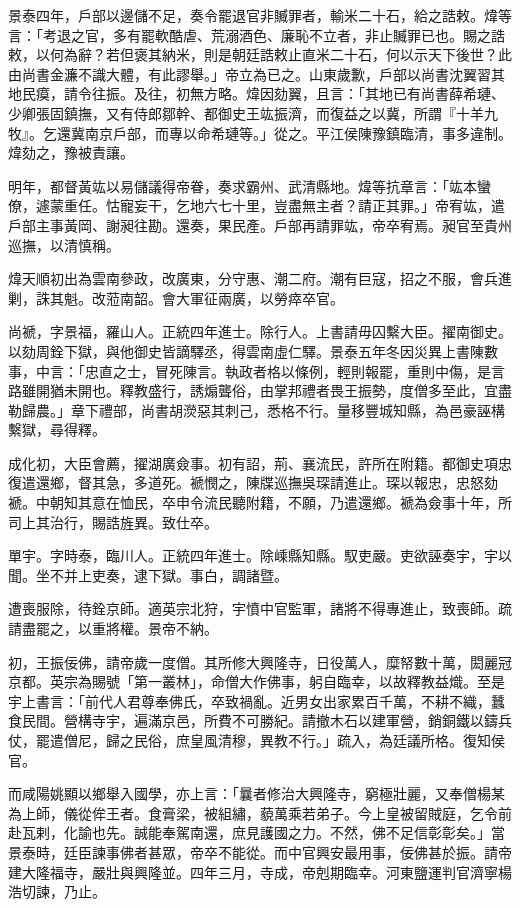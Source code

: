 \begin{pinyinscope}
景泰四年，戶部以邊儲不足，奏令罷退官非贓罪者，輸米二十石，給之誥敕。煒等言：「考退之官，多有罷軟酷虐、荒溺酒色、廉恥不立者，非止贓罪已也。賜之誥敕，以何為辭？若但褒其納米，則是朝廷誥敕止直米二十石，何以示天下後世？此由尚書金濂不識大體，有此謬舉。」帝立為已之。山東歲歉，戶部以尚書沈翼習其地民瘼，請令往振。及往，初無方略。煒因劾翼，且言：「其地已有尚書薛希璉、少卿張固鎮撫，又有侍郎鄒幹、都御史王竑振濟，而復益之以冀，所謂『十羊九牧』。乞還冀南京戶部，而專以命希璉等。」從之。平江侯陳豫鎮臨清，事多違制。煒劾之，豫被責讓。

明年，都督黃竑以易儲議得帝眷，奏求霸州、武清縣地。煒等抗章言：「竑本蠻僚，遽蒙重任。怙寵妄干，乞地六七十里，豈盡無主者？請正其罪。」帝宥竑，遣戶部主事黃岡、謝昶往勘。還奏，果民產。戶部再請罪竑，帝卒宥焉。昶官至貴州巡撫，以清慎稱。

煒天順初出為雲南參政，改廣東，分守惠、潮二府。潮有巨寇，招之不服，會兵進剿，誅其魁。改蒞南韶。會大軍征兩廣，以勞瘁卒官。

尚褫，字景福，羅山人。正統四年進士。除行人。上書請毋囚繫大臣。擢南御史。以劾周銓下獄，與他御史皆謫驛丞，得雲南虛仁驛。景泰五年冬因災異上書陳數事，中言：「忠直之士，冒死陳言。執政者格以條例，輕則報罷，重則中傷，是言路雖開猶未開也。釋教盛行，誘煽聾俗，由掌邦禮者畏王振勢，度僧多至此，宜盡勒歸農。」章下禮部，尚書胡濙惡其刺己，悉格不行。量移豐城知縣，為邑豪誣構繫獄，尋得釋。

成化初，大臣會薦，擢湖廣僉事。初有詔，荊、襄流民，許所在附籍。都御史項忠復遣還鄉，督其急，多道死。褫憫之，陳牒巡撫吳琛請進止。琛以報忠，忠怒劾褫。中朝知其意在恤民，卒申令流民聽附籍，不願，乃遣還鄉。褫為僉事十年，所司上其治行，賜誥旌異。致仕卒。

單宇。字時泰，臨川人。正統四年進士。除嵊縣知縣。馭吏嚴。吏欲誣奏宇，宇以聞。坐不并上吏奏，逮下獄。事白，調諸暨。

遭喪服除，待銓京師。適英宗北狩，宇憤中官監軍，諸將不得專進止，致喪師。疏請盡罷之，以重將權。景帝不納。

初，王振佞佛，請帝歲一度僧。其所修大興隆寺，日役萬人，糜帑數十萬，閎麗冠京都。英宗為賜號「第一叢林」，命僧大作佛事，躬自臨幸，以故釋教益熾。至是宇上書言：「前代人君尊奉佛氏，卒致禍亂。近男女出家累百千萬，不耕不織，蠶食民間。營構寺宇，遍滿京邑，所費不可勝紀。請撤木石以建軍營，銷銅鐵以鑄兵仗，罷遣僧尼，歸之民俗，庶皇風清穆，異教不行。」疏入，為廷議所格。復知侯官。

而咸陽姚顯以鄉舉入國學，亦上言：「曩者修治大興隆寺，窮極壯麗，又奉僧楊某為上師，儀從侔王者。食膏梁，被組繡，藐萬乘若弟子。今上皇被留賊庭，乞令前赴瓦剌，化諭也先。誠能奉駕南還，庶見護國之力。不然，佛不足信彰彰矣。」當景泰時，廷臣諫事佛者甚眾，帝卒不能從。而中官興安最用事，佞佛甚於振。請帝建大隆福寺，嚴壯與興隆並。四年三月，寺成，帝剋期臨幸。河東鹽運判官濟寧楊浩切諫，乃止。


\end{pinyinscope}
